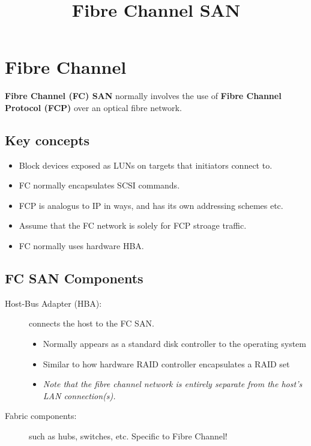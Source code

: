 \documentclass[slides]{pgnotes}
\title{Fibre Channel SAN}
\begin{document}
\maketitle

\section{Fibre Channel}
\label{sec:fibre-channel}

\begin{center}
  \textbf{Fibre Channel (FC) SAN} normally involves the use of \textbf{Fibre Channel Protocol (FCP)} over an optical fibre network.
  \end{center}

\subsection{Key concepts}

\begin{itemize}
\item
  Block devices exposed as LUNs on targets that initiators connect to.
\item
  FC normally encapsulates SCSI commands.
\item
  FCP is analogus to IP in ways, and has its own addressing schemes etc.
\item
  Assume that the FC network is solely for FCP stroage traffic.
\item
  FC normally uses hardware HBA.
\end{itemize}

\subsection{FC SAN Components}
\label{sec:fc-san-components}

\begin{description}
\item[Host-Bus Adapter (HBA):] connects the host to the FC SAN.
  \begin{itemize}
  \item Normally appears as a standard disk controller to the operating system
  \item Similar to how hardware RAID controller encapsulates a RAID set
  \item \textit{Note that the fibre channel network is entirely separate from the host's LAN connection(s).}    
  \end{itemize} 
\item[Fabric components:] such as hubs, switches, etc. Specific to Fibre Channel!
\end{description}
\end{document}

